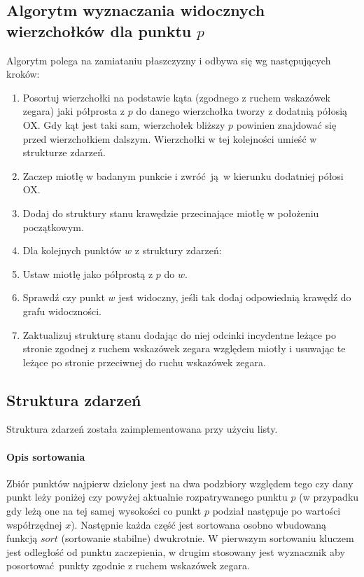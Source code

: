 \documentclass[12pt]{article}
\let\tempone\itemize
\let\temptwo\enditemize
\renewenvironment{itemize}{\tempone\setlength{\itemsep}{0cm}}{\temptwo}
\begin{document}
	\subsection{Algorytm wyznaczania widocznych wierzchołków dla punktu $ p $} \label{sssec:algo}
		Algorytm polega na zamiataniu płaszczyzny i odbywa się wg następujących kroków:
		\begin{enumerate}
			\item Posortuj wierzchołki na podstawie kąta (zgodnego z ruchem wskazówek zegara) jaki półprosta z $ p $ do danego wierzchołka tworzy z dodatnią półosią OX. Gdy kąt jest taki sam, wierzchołek bliższy $ p $ powinien znajdować się przed wierzchołkiem dalszym. Wierzchołki w tej kolejności umieść w strukturze zdarzeń.
			\item Zaczep miotłę w badanym punkcie i zwróć ją w kierunku dodatniej półosi OX.
			\item Dodaj do struktury stanu krawędzie przecinające miotłę w położeniu początkowym.
			\item Dla kolejnych punktów $ w $ z struktury zdarzeń:
			\begin{itemize}
				\item Ustaw miotłę jako półprostą z $ p $ do $ w $.
				\item Sprawdź czy punkt $ w $ jest widoczny, jeśli tak dodaj odpowiednią krawędź do grafu widoczności.
				\item Zaktualizuj strukturę stanu dodając do niej odcinki incydentne leżące po stronie zgodnej z ruchem wskazówek zegara względem miotły i usuwając te leżące po stronie przeciwnej do ruchu wskazówek zegara.
			\end{itemize}
		\end{enumerate}
	
		\subsection{Struktura zdarzeń}
			Struktura zdarzeń została zaimplementowana przy użyciu listy. 
			
			\paragraph{Opis sortowania}
				Zbiór punktów najpierw dzielony jest na dwa podzbiory względem tego czy dany punkt leży poniżej czy powyżej aktualnie rozpatrywanego punktu $ p $ (w przypadku gdy leżą one na tej samej wysokości co punkt $ p $ podział następuje po wartości współrzędnej $ x $). Następnie każda część jest sortowana osobno wbudowaną funkcją $ sort $ (sortowanie stabilne) dwukrotnie. W pierwszym sortowaniu kluczem jest odległość od punktu zaczepienia, w drugim stosowany jest wyznacznik aby posortować punkty zgodnie z ruchem wskazówek zegara.
			
\end{document}
